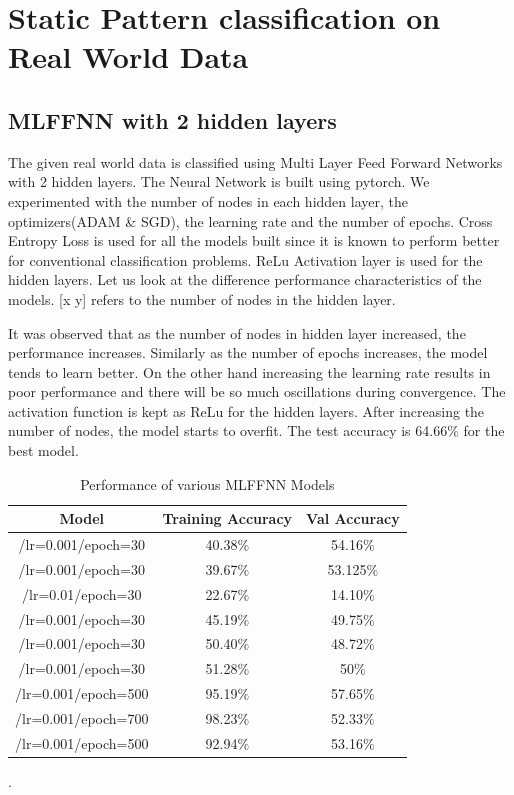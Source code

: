 \section{Static Pattern classification on Real World Data}

\subsection{MLFFNN with 2 hidden layers}
 
 The given real world data is classified using Multi Layer Feed Forward Networks with 2 hidden layers. The Neural Network is built using pytorch. We experimented with the number of nodes in each hidden layer, the optimizers(ADAM \& SGD), the learning rate and the number of epochs. Cross Entropy Loss is used for all the models built since it is known to perform better for conventional classification problems. ReLu Activation layer is used for the hidden layers. Let us look at the difference performance characteristics of the models. [x y] refers to the number of nodes in the hidden layer.
 
 It was observed that as the number of nodes in hidden layer increased, the performance increases. Similarly as the number of epochs increases, the model tends to learn better. On the other hand increasing the learning rate results in poor performance and there will be so much oscillations during convergence. The activation function is kept as ReLu for the hidden layers. After increasing the number of nodes, the model starts to overfit. The test accuracy is 64.66$\%$ for the best model.
{
\begin{table}[!h]
\centering
\begin{tabular}{ |c|c|c|  }
\hline
\rowcolor{lightgray} Model & Training Accuracy & Val Accuracy\\
\hline
[40 20]/lr=0.001/epoch=30 & 40.38$\%$  & 54.16$\%$  \\ 
\hline
[80 40]/lr=0.001/epoch=30 & 39.67$\%$  & 53.125$\%$  \\ 
\hline
[80 40]/lr=0.01/epoch=30 & 22.67$\%$  & 14.10$\%$  \\ 
\hline
[120 80]/lr=0.001/epoch=30 & 45.19$\%$  & 49.75$\%$  \\ 
\hline
[240 160]/lr=0.001/epoch=30 & 50.40$\%$  & 48.72$\%$  \\ 
\hline
[500 250]/lr=0.001/epoch=30 & 51.28$\%$  & 50$\%$  \\ 
\hline
[500 250]/lr=0.001/epoch=500 & 95.19$\%$  & 57.65$\%$  \\ 
\hline
[500 250]/lr=0.001/epoch=700 & 98.23$\%$  & 52.33$\%$  \\ 
\hline
[500 500]/lr=0.001/epoch=500 & 92.94$\%$  & 53.16$\%$  \\ 
\hline
\end{tabular}
\caption{Performance of various MLFFNN Models}.
\label{table:3}
\end{table}
}

